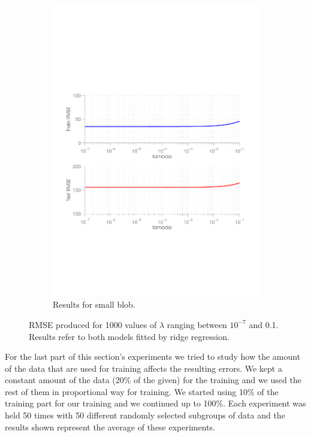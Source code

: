 \begin{figure}[ht]
\begin{subfigure}[b]{0.45\textwidth}
    \includegraphics[width=\textwidth]{figures/lambda_curve2.pdf}
    \caption{Results for small blob.}
    \label{fig:lambda2}
  \end{subfigure}
  \caption{RMSE produced for 1000 values of $\lambda$ ranging between $10^{-7}$ and 0.1. Results refer to both models fitted by ridge regression.}
\end{figure}

For the last part of this section's experiments we tried to study how the amount of the data that are used for training affects the resulting errors. We kept a constant amount of the data (20\% of the given) for the training and we used the rest of them in proportional way for training. We started using 10\% of the training part for our training and we continued up to 100\%. Each experiment was held 50 times with 50 different randomly selected subgroups of data and the results shown represent the average of these experiments.

